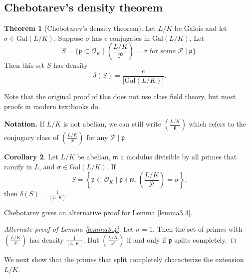 \documentclass{article}
\theoremstyle{definition}
\newtheorem{theorem}{Theorem}[section]
\newtheorem{cor}[theorem]{Corollary}
\begin{document}
\subsection{Chebotarev's density theorem}
\begin{theorem}[Chebotarev's density theorem]\label{theorem3.13}
    Let $L/K$ be Galois and let $\sigma \in \text{Gal}(L/K)$. Suppose $\sigma$ has $c$ conjugates in $\text{Gal}(L/K)$. Let $$S = \{\mathfrak{p} \subset \mathcal{O}_K \mid \left(\frac{L/K}{\mathcal{P}}\right) = \sigma \text{ for some }\mathcal{P}\mid \mathfrak{p}\}.$$
    Then this set $S$ has density $$\delta(S)=\frac{c}{\left|\text{Gal}(L/K)\right|}.$$
\end{theorem}
Note that the original proof of this does not use class field theory, but most proofs in modern textbooks do.
\vspace{1mm}
 
\textbf{Notation.} If $L/K$ is not abelian, we can still write $\left(\frac{L/K}{\mathfrak{p}}\right)$ which refers to the conjugacy class of $\left(\frac{L/K}{\mathcal{P}}\right)$ for any $\mathcal{P} \mid \mathfrak{p}$.
\begin{cor}\label{cor3.14}
    Let $L/K$ be abelian, $\mathfrak{m}$ a modulus divisible by all primes that ramify in $L$, and $\sigma \in \text{Gal}(L/K)$. If \[
    S = \left\{\mathfrak{p} \subset \mathcal{O}_K \mid \mathfrak{p}\nmid \mathfrak{m}, \left(\frac{L/K}{\mathcal{P}}\right) = \sigma\right\},
    \]
    then $\delta(S)=\frac{1}{[L:K]}$.
\end{cor}
Chebotarev gives an alternative proof for Lemma \ref{lemma3.4}.
\begin{proof}[Alternate proof of Lemma \ref{lemma3.4}]
    Let $\sigma=1$. Then the set of primes with $\left(\frac{L/K}{\mathcal{P}}\right)$ has density $\frac{1}{[L:K]}$. But $\left(\frac{L/K}{\mathcal{P}}\right)$ if and only if $\mathfrak{p}$ splits completely.
\end{proof}
We next show that the primes that split completely characterize the extension $L/K$.
\vspace{1mm}
 
\end{document}
